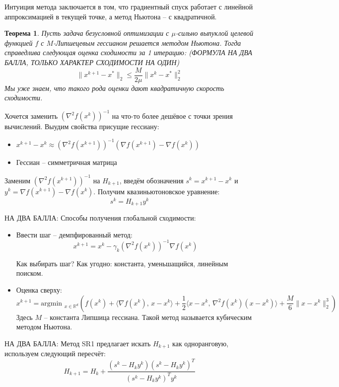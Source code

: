 \documentclass[a4paper,12pt]{article}
\renewcommand{\leq}{\ensuremath{\leqslant}}
\theoremstyle{plain}
\newtheorem{theorem}{Теорема}[section]
\theoremstyle{definition}
\theoremstyle{remark}
\begin{document}
Интуиция метода заключается в том, что градиентный спуск работает с линейной аппроксимацией в текущей точке, а метод Ньютона -- с квадратичной.

\begin{theorem}
	Пусть задача безусловной оптимизации с $\mu$-сильно выпуклой целевой функцией $f$ с $M$-Липшецевым гессианом решается методом Ньютона. Тогда справедлива следующая оценка сходимости за 1 итерацию: (ФОРМУЛА НА ДВА БАЛЛА, ТОЛЬКО ХАРАКТЕР СХОДИМОСТИ НА ОДИН)
	\[
		\|x^{k + 1} - x^*\|_2 \leq \frac{M}{2\mu}\|x^k - x^*\|_2^2
	\]
	Мы уже знаем, что такого рода оценки дают квадратичную скорость сходимости.
\end{theorem}

Хочется заменить $(\nabla^2 f(x^k))^{-1}$ на что-то более дешёвое с точки зрения вычислений. Выудим свойства присущие гессиану:
\begin{itemize}
	\item $x^{k + 1} - x^k \approx (\nabla^2 f(x^{k + 1}))^{-1}(\nabla f(x^{k + 1}) - \nabla f(x^k))$
	\item Гессиан -- симметричная матрица
\end{itemize}
Заменим $(\nabla^2 f(x^{k + 1}))^{-1}$ на $H_{k + 1}$, введём обозначения $s^k = x^{k + 1} - x^k$ и $y^k = \nabla f(x^{k + 1}) - \nabla f(x^k)$. Получим квазиньютоновское уравнение:
\[
	s^k = H_{k + 1}y^k
\]

НА ДВА БАЛЛА:
Способы получения глобальной сходимости:
\begin{itemize}
	\item Ввести шаг -- демпфированный метод:
	      \[
		      x^{k + 1} = x^k - \gamma_k(\nabla^2 f(x^k))^{-1}\nabla f(x^k)
	      \]

	      Как выбирать шаг? Как угодно: константа, уменьшащийся, линейным поиском.

	\item Оценка сверху:
	      \[
		      x^{k + 1} = \text{argmin }_{x \in \mathbb{R}^d}\left(f(x^k) + \langle \nabla f(x^k),\, x - x^k\rangle + \frac{1}{2}\langle x - x^k,\, \nabla^2 f(x^k)(x - x^k)\rangle + \frac{M}{6}\|x - x^k\|_2^3\right)
	      \]
	      Здесь $M$ -- константа Липшица гессиана. Такой метод называется кубическим методом Ньютона.
\end{itemize}

НА ДВА БАЛЛА:
Метод SR1 предлагает искать $H_{k + 1}$ как одноранговую, используем следующий пересчёт:
\[
	H_{k + 1} = H_k + \frac{(s^k - H_ky^k)(s^k - H_ky^k)^T}{(s^k - H_ky^k)^Ty^k}
\]
\end{document}
